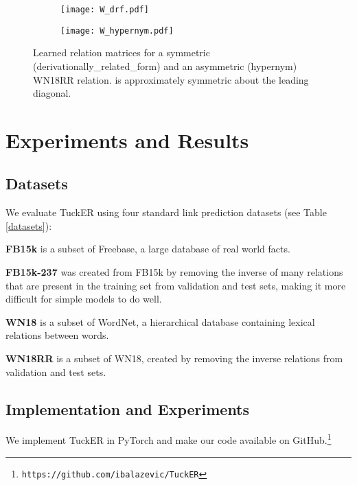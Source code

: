 \documentclass[11pt,a4paper]{article}
\begin{document}
\begin{figure}[!ht]
\centering
\begin{subfigure}[b]{0.23\textwidth}
    \centering
    \texttt{[image: W\_drf.pdf]}
    \caption{}
    \label{fig:drf}
\end{subfigure}
\begin{subfigure}[b]{0.23\textwidth}
    \centering
    \texttt{[image: W\_hypernym.pdf]}
    \caption{}
    \label{fig:hypernym}
\end{subfigure}
\caption{Learned relation matrices for a symmetric (derivationally\_related\_form) and an asymmetric (hypernym) WN18RR relation.  is approximately symmetric about the leading diagonal.}
\label{fig:asymmetry}
\end{figure}

\vspace{-0.4cm}
\section{Experiments and Results}

\subsection{Datasets}

We evaluate TuckER using four standard link prediction datasets (see Table \ref{datasets}):

\noindent\textbf{FB15k}  \cite{bordes2013translating} is a subset of Freebase, a large database of real world facts.

\noindent\textbf{FB15k-237} \cite{toutanova2015representing} was created from FB15k by removing the inverse of many relations that are present in the training set from validation and test sets, making it more difficult for simple models to do well.

\noindent\textbf{WN18}  \cite{bordes2013translating} is a subset of WordNet, a hierarchical database containing lexical relations between words.

\noindent\textbf{WN18RR} \cite{dettmers2018convolutional} is a subset of WN18, created by removing the inverse relations from validation and test sets. 
 
\subsection{Implementation and Experiments}
We implement TuckER in PyTorch \cite{paszke2017automatic} and make our code available on GitHub.\footnote{\texttt{https://github.com/ibalazevic/TuckER}}
\end{document}

